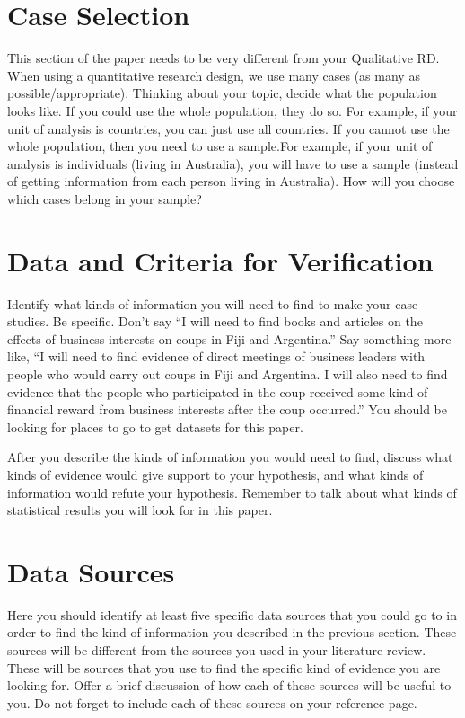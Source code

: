 \documentclass{turabian-researchpaper}
\begin{document}
\section{Case Selection}
This section of the paper needs to be very different from your Qualitative RD. When using a quantitative research design, we use many cases (as many as possible/appropriate). Thinking about your topic, decide what the population looks like. If you could use the whole population, they do so. For example, if your unit of analysis is countries, you can just use all countries. If you cannot use the whole population, then you need to use a sample.For example, if your unit of analysis is individuals (living in Australia), you will have to use a sample (instead of getting information from each person living in Australia). How will you choose which cases belong in your sample?

\section{Data and Criteria for Verification}
Identify what kinds of information you will need to find to make your case studies. Be specific. Don't say ``I will need to find books and articles on the effects of business interests on coups in Fiji and Argentina.'' Say something more like, ``I will need to find evidence of direct meetings of business leaders with people who would carry out coups in Fiji and Argentina. I will also need to find evidence that the people who participated in the coup received some kind of financial reward from business interests after the coup occurred.'' You should be looking for places to go to get datasets for this paper.

After you describe the kinds of information you would need to find, discuss what kinds of evidence would give support to your hypothesis, and what kinds of information would refute your hypothesis. Remember to talk about what kinds of statistical results you will look for in this paper.

\section{Data Sources}
Here you should identify at least five specific data sources that you could go to in order to find the kind of information you described in the previous section. These sources will be different from the sources you used in your literature review. These will be sources that you use to find the specific kind of evidence you are looking for. Offer a brief discussion of how each of these sources will be useful to you. Do not forget to include each of these sources on your reference page.
\end{document}
